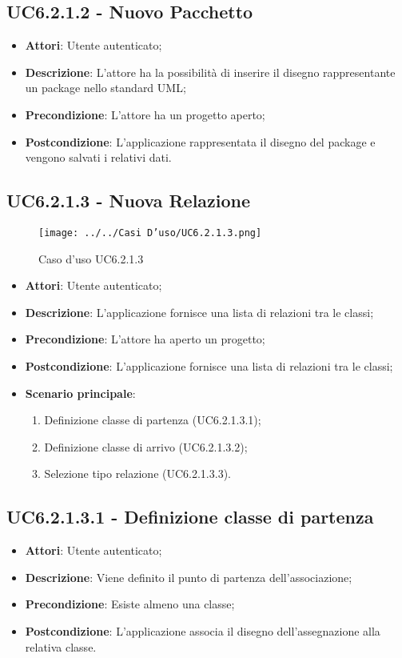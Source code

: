 \subsection{UC6.2.1.2 - Nuovo Pacchetto} 
\label{ssec:UC6.2.1.2} 
\begin{itemize} 
\item \textbf{Attori}: Utente autenticato;
\item \textbf{Descrizione}: L'attore ha la possibilità di inserire il disegno rappresentante un package nello standard UML;
\item \textbf{Precondizione}: L'attore ha un progetto aperto;
\item \textbf{Postcondizione}: L'applicazione rappresentata il disegno del package e vengono salvati i relativi dati.
\end{itemize} 
\newpage
\subsection{UC6.2.1.3 - Nuova Relazione} 
\label{ssec:UC6.2.1.3} 
\begin{figure}[h!] 
\centering 
\texttt{[image: ../../Casi D'uso/UC6.2.1.3.png]} 
\caption{Caso d'uso UC6.2.1.3} 
 \end{figure} 
\begin{itemize} 
\item \textbf{Attori}: Utente autenticato;
\item \textbf{Descrizione}: L'applicazione fornisce una lista di relazioni tra le classi;
\item \textbf{Precondizione}: L'attore ha aperto un progetto;
\item \textbf{Postcondizione}: L'applicazione fornisce una lista di relazioni tra le classi;
\item \textbf{Scenario principale}: \begin{enumerate}\item Definizione classe di partenza (UC6.2.1.3.1);\item Definizione classe di arrivo (UC6.2.1.3.2);\item Selezione tipo relazione (UC6.2.1.3.3). 
 \end{enumerate}
\end{itemize} 
\subsection{UC6.2.1.3.1 - Definizione classe di partenza} 
\label{ssec:UC6.2.1.3.1} 
\begin{itemize} 
\item \textbf{Attori}: Utente autenticato;
\item \textbf{Descrizione}: Viene definito il punto di partenza dell'associazione;
\item \textbf{Precondizione}: Esiste almeno una classe;
\item \textbf{Postcondizione}: L'applicazione associa il disegno dell'assegnazione alla relativa classe.
\end{itemize} 
